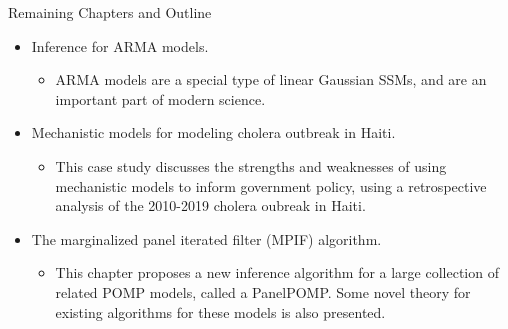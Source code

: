\documentclass[aspectratio=169]{beamer}\usepackage[]{graphicx}\usepackage[]{xcolor}
\begin{document}
\begin{frame}{Remaining Chapters and Outline}
  \begin{itemize}
    \item Inference for ARMA models.
      \begin{itemize}
        \item ARMA models are a special type of linear Gaussian SSMs, and are an important part of modern science. 
      \end{itemize}
    \item Mechanistic models for modeling cholera outbreak in Haiti.
      \begin{itemize}
        \item This case study discusses the strengths and weaknesses of using mechanistic models to inform government policy, using a retrospective analysis of the 2010-2019 cholera oubreak in Haiti.
      \end{itemize}
    \item The marginalized panel iterated filter (MPIF) algorithm.
    \begin{itemize}
      \item This chapter proposes a new inference algorithm for a large collection of related POMP models, called a PanelPOMP. Some novel theory for existing algorithms for these models is also presented.
    \end{itemize}
  \end{itemize}
\end{frame}
\end{document}
